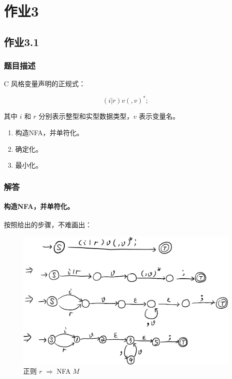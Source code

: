 
\section{作业3}
\subsection{作业3.1}
\subsubsection{题目描述}

C 风格变量声明的正规式：

\[(i|r)v(,v)^*;\]

其中 $i$ 和 $r$ 分别表示整型和实型数据类型，$v$ 表示变量名。

\begin{enumerate}
    \item 构造NFA，并单符化。
    \item 确定化。
    \item 最小化。
\end{enumerate}

\subsubsection{解答}

\paragraph{构造NFA，并单符化。} 按照给出的步骤，不难画出：

\begin{figure}[H]
    \centering
    \includegraphics[width=0.8\linewidth]{imgs/3.png}
    \caption{正则 $r$ $\Rightarrow\;$NFA $M$}
    \label{fig:NFA}
\end{figure}

